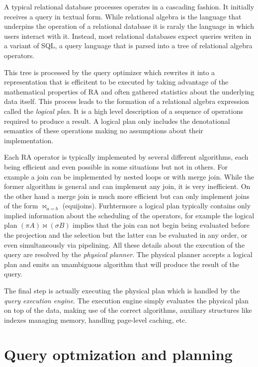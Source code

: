 A typical relational database processes operates in a cascading
fashion. It initially receives a query in textual form. While
relational algebra is the language that underpins the operation of a
relational database it is raraly the language in which users interact
with it. Instead, most relational databases expect queries writen in a
variant of SQL, a query language that is parsed into a tree of
relational algebra operators.

This tree is processed by the query optimizer which rewrites it into a
representation that is efficitent to be executed by taking advantage
of the mathematical properties of RA and often gathered statistics
about the underlying data itself. This process leads to the formation
of a relational algebra expression called the \emph{logical plan}. It
is a high level description of a sequence of operations required to
produce a result. A logical plan only includes the denotational
semantics of these operations making no assumptions about their
implementation.

Each RA operator is typically implemented by several different
algorithms, each being efficient and even possible in some situations
but not in others. For example a join can be implemented by nested
loops or with merge join.  While the former algorithm is general and
can implement any join, it is very inefficient. On the other hand a
merge join is much more efficient but can only implement joins of the
form \(\Join_{a=b}\) (equijoins). Furhtermore a logical plan typically
contains only implied information about the scheduling of the
operators, for example the logical plan \((\pi A) \Join (\sigma B)\)
implies that the join can not begin being evaluated before the
projection and the selection but the latter can be evaluated in any
order, or even simultaneously via pipelining. All these details about
the execution of the query are resolved by the \emph{physical
  planner}. The physical planner accepts a logical plan and emits an
unambiguous algorithm that will produce the result of the query.

The final step is actually executing the physical plan which is
handled by the \emph{query execution engine}. The execution engine
simply evaluates the physical plan on top of the data, making use of
the correct algorithms, auxiliary structures like indexes managing
memory, handling page-level caching, etc.


\section{Query optmization and planning}

